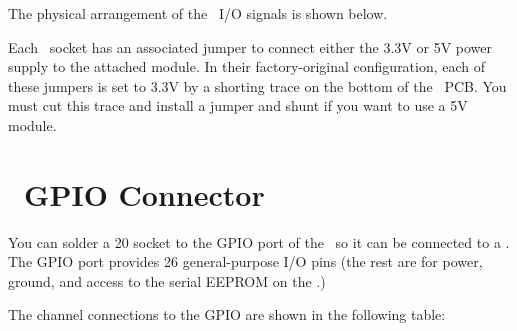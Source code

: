 \documentclass[letterpaper,11pt,oneside]{memoir}
\renewcommand{\fixedpic}[1]{}
\begin{document}
\pagebreak %

The physical arrangement of the \digpmod\ I/O signals is shown below.

\fixedpic{\texttt{[image: PMOD\_socket.jpg]}}

Each \digpmod\ socket has an associated jumper to connect either the 3.3V or 5V power
supply to the attached module. 
In their factory-original configuration, each of these jumpers is set to 3.3V 
by a shorting trace on the bottom of the \product\ PCB. 
You must cut this trace and install a jumper and shunt if you want to use a 5V module.

\fixedpic{\texttt{[image: shorting\_traces.jpg]}}


\section{\rpi\ GPIO Connector}

You can solder a 20 socket to the GPIO port of the \product\ 
so it can be connected to a \rpi.
The GPIO port provides 26 general-purpose I/O pins (the rest are for power, ground,
and access to the serial EEPROM on the \product.)

\fixedpic{\texttt{[image: rpi\_socket.png]}}

\pagebreak %

The channel connections to the GPIO are shown in the following table:
\end{document}
